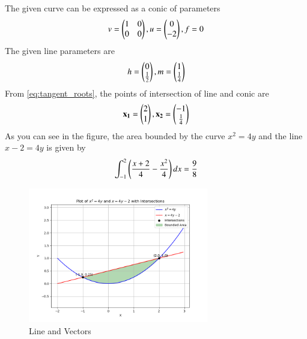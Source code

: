\documentclass[journal]{IEEEtran}
\begin{document}
The given curve can be expressed as a conic of parameters
\begin{align}
	v=\begin{pmatrix}1&0\\0&0\end{pmatrix}, u=\begin{pmatrix}0\\-2\end{pmatrix}, f=0 
\end{align}
The given line parameters are
\begin{align}
	h=\begin{pmatrix}0\\ \frac{1}{2}\end{pmatrix},  m=\begin{pmatrix}1\\\frac{1}{4}\end{pmatrix}
\end{align}
From \eqref{eq:tangent_roots}, the points of intersection of line and conic are
\begin{align}
	\mathbf{x_1} = \begin{pmatrix}2\\1\end{pmatrix},  \mathbf{x_2} = \begin{pmatrix}-1\\\frac{1}{4}\end{pmatrix}
\end{align}
As you can see in the figure, the area bounded by the curve $x^{2} = 4y$ and the line $x - 2 = 4y $  is given by
\begin{align}
	\int_{-1}^{2} \left(\frac{x + 2}{4} - \frac{x^{2}}{4}\right)dx = \frac{9}{8} 
\end{align}
\newpage
\begin{figure}[h!]
\begin{center}
	\includegraphics[width=0.7\textwidth]{Fig/fig.png}
	\caption{Line and Vectors}
	\label{fig:9-9.2-22 - Figure -1}
\end{center}
\end{figure}
\end{document}
